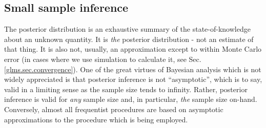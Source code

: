\subsection{Small sample inference}

The posterior distribution is an exhaustive summary of the
state-of-knowledge about an unknown quantity. It is {\it the}
posterior distribution - not an estimate of that thing. It is also
not, usually, an approximation except to within Monte Carlo error (in
cases where we use simulation to calculate it, see
Sec. \ref{glms.sec.convergence}).  One of the great virtues of
Bayesian analysis which is not widely appreciated is that posterior
inference is not ``asymptotic'', which is to say, valid in a limiting
sense as the sample size tends to infinity. Rather, posterior
inference is valid for {\it any} sample size and, in particular, {\it
  the} sample size on-hand.  Conversely, almost all frequentist
procedures are based on asymptotic approximations to the procedure
which is being employed.

